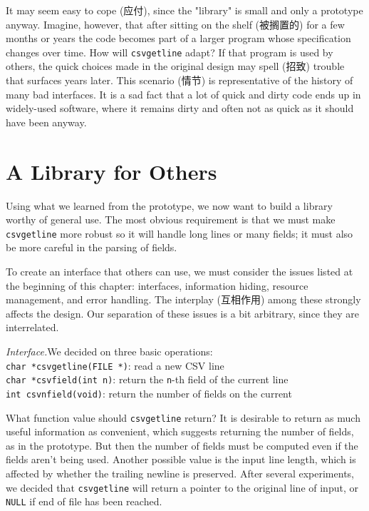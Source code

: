 It may seem easy to cope (应付), since the "library" is small and only a
prototype anyway. Imagine, however, that after sitting on the shelf
(被搁置的) for a few months or years the code becomes part of a larger
program whose specification changes over time. How will \verb'csvgetline'
adapt? If that program is used by others, the quick choices made in the
original design may spell (招致) trouble that surfaces years later. This
scenario (情节) is representative of the history of many bad interfaces. It
is a sad fact that a lot of quick and dirty code ends up in widely-used
software, where it remains dirty and often not as quick as it should have
been anyway.

\section{A Library for Others}
\label{sec:a_library_for_others}

Using what we learned from the prototype, we now want to build a library
worthy of general use. The most obvious requirement is that we must make
\verb'csvgetline' more robust so it will handle long lines or many fields;
it must also be more careful in the parsing of fields.

To create an interface that others can use, we must consider the issues
listed at the beginning of this chapter: interfaces, information hiding,
resource management, and error handling. The interplay (互相作用) among
these strongly affects the design. Our separation of these issues is a bit
arbitrary, since they are interrelated.

\emph{Interface.}We decided on three basic operations: \\
\indent\indent\texttt{char *csvgetline(FILE *)}: read a new CSV line \\
\indent\indent\texttt{char *csvfield(int n)}: return the \verb'n'-th field
of the current line \\
\indent\indent\texttt{int csvnfield(void)}: return the number of fields on
the current

What function value should \verb'csvgetline' return? It is desirable to
return as much useful information as convenient, which suggests returning
the number of fields, as in the prototype. But then the number of fields
must be computed even if the fields aren't being used. Another possible
value is the input line length, which is affected by whether the trailing
newline is preserved. After several experiments, we decided that
\verb'csvgetline' will return a pointer to the original line of input, or
\verb'NULL' if end of file has been reached.

